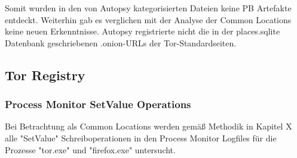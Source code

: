 \begin{appendices}
Somit wurden in den von Autopsy kategorisierten Dateien keine PB Artefakte entdeckt. Weiterhin gab es verglichen mit der Analyse der Common Locations keine neuen Erkenntnisse. Autopsy registrierte nicht die in der places.sqlite Datenbank geschriebenen .onion-URLs der Tor-Standardseiten.


\subsection*{Tor Registry}

\subsubsection*{Process Monitor SetValue Operations}

Bei Betrachtung als Common Locations werden gemäß Methodik in Kapitel X alle "SetValue" Schreiboperationen in den Process Monitor Logfiles für die Prozesse "tor.exe" und "firefox.exe" untersucht. 


\end{appendices}
